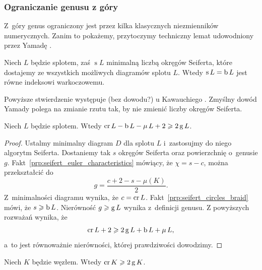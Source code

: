 
\subsubsection{Ograniczanie genusu z góry}
Z~góry genus ograniczony jest przez kilka klasycznych niezmienników numerycznych.
Zanim to pokażemy, przytoczymy techniczny lemat udowodniony przez Yamadę \cite{yamada1987}.
%

\begin{proposition}
%
\label{prp:seifert_circles_braid}%
    Niech $L$ będzie splotem, zaś $\operatorname{s} L$ minimalną liczbą okręgów Seiferta, które dostajemy ze wszystkich możliwych diagramów splotu $L$.
    Wtedy $\operatorname{s} L = \operatorname{b} L$ jest równe indeksowi warkoczowemu.
\end{proposition}

Powyższe stwierdzenie występuje (bez dowodu?) u Kawauchiego \cite[s. 17]{kawauchi1996}.
Zmyślny dowód Yamady polega na zmianie rzutu tak, by nie zmienić liczby okręgów Seiferta.

\begin{proposition}
    Niech $L$ będzie splotem.
    Wtedy $\operatorname{cr} L - \operatorname{b} L - \operatorname{\mu} L + 2 \geqslant 2 \operatorname{g} L$.
\end{proposition}

\begin{proof}
    Ustalmy minimalny diagram $D$ dla splotu $L$ i~zastosujmy do niego algorytm Seiferta.
    Dostaniemy tak $s$ okręgów Seiferta oraz powierzchnię o~genusie $g$.
    Fakt~\ref{prp:seifert_euler_characteristics} mówiący, że $\chi = s - c$, można przekształcić do
    \begin{equation}
        g = \frac{c + 2 - s - \mu(K)}{2}.
    \end{equation}
    Z~minimalności diagramu wynika, że $c = \operatorname{cr} L$.
    Fakt~\ref{prp:seifert_circles_braid} mówi, że $s \geqslant \operatorname{b} L$.
    Nierówność $g \geqslant \operatorname{g} L$ wynika z~definicji genusu.
    Z powyższych rozważań wynika, że
    \begin{equation}
        \operatorname{cr} L + 2 \geqslant 2 \operatorname{g} L + \operatorname{b} L + \operatorname{\mu} L,
    \end{equation}
    a~to jest równoważnie nierówności, której prawdziwości dowodzimy.
\end{proof}

\begin{corollary}
%
\label{cor:crossing_genus}%
    Niech $K$ będzie węzłem.
    Wtedy $\operatorname{cr} K \geqslant 2 \operatorname{g} K$.
\end{corollary}

